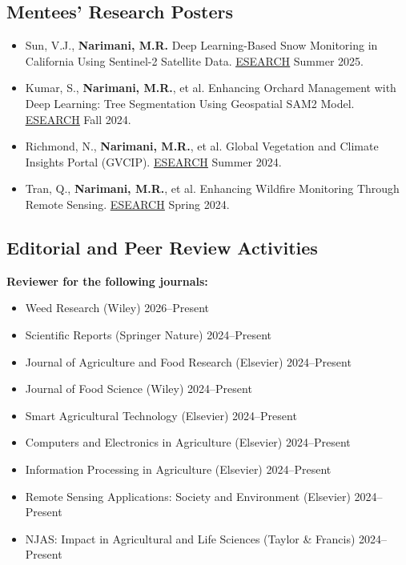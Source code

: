 \documentclass[11pt,a4paper]{article}
\begin{document}
\subsection{Mentees' Research Posters}
\begin{itemize}
    \item Sun, V.J., \textbf{Narimani, M.R.} Deep Learning-Based Snow Monitoring in California Using Sentinel-2 Satellite Data. \href{https://engineering.ucdavis.edu/e-search}{\underline{ESEARCH}} Summer 2025.
    \item Kumar, S., \textbf{Narimani, M.R.}, et al. Enhancing Orchard Management with Deep Learning: Tree Segmentation Using Geospatial SAM2 Model. \href{https://engineering.ucdavis.edu/e-search}{\underline{ESEARCH}} Fall 2024.
    \item Richmond, N., \textbf{Narimani, M.R.}, et al. Global Vegetation and Climate Insights Portal (GVCIP). \href{https://engineering.ucdavis.edu/e-search}{\underline{ESEARCH}} Summer 2024.
    \item Tran, Q., \textbf{Narimani, M.R.}, et al. Enhancing Wildfire Monitoring Through Remote Sensing. \href{https://engineering.ucdavis.edu/e-search}{\underline{ESEARCH}} Spring 2024.
\end{itemize}

\subsection{Editorial and Peer Review Activities}
\textbf{Reviewer for the following journals:}
\begin{itemize}
    \item Weed Research (Wiley) \hfill 2026--Present
    \item Scientific Reports (Springer Nature) \hfill 2024--Present
    \item Journal of Agriculture and Food Research (Elsevier) \hfill 2024--Present
    \item Journal of Food Science (Wiley) \hfill 2024--Present
    \item Smart Agricultural Technology (Elsevier) \hfill 2024--Present
    \item Computers and Electronics in Agriculture (Elsevier) \hfill 2024--Present
    \item Information Processing in Agriculture (Elsevier) \hfill 2024--Present
    \item Remote Sensing Applications: Society and Environment (Elsevier) \hfill 2024--Present
    \item NJAS: Impact in Agricultural and Life Sciences (Taylor \& Francis) \hfill 2024--Present
\end{itemize}
\end{document}
